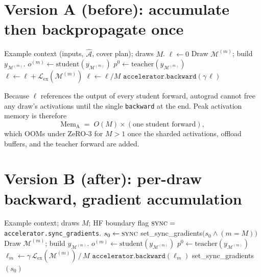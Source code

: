 \documentclass{article}
\newcommand{\Ahat}{\widehat{\mathcal A}}
\newcommand{\Mset}{\mathcal M}
\newcommand{\Lex}{\mathcal L_{\mathrm{ex}}}
\newcommand{\bad}[1]{\textcolor{red!70!black}{#1}}
\newcommand{\good}[1]{\textcolor{green!45!black}{#1}}
\theoremstyle{plain}
\theoremstyle{remark}
\begin{document}
\section{Version A (before): accumulate then backpropagate once}

\begin{algorithm}[h]
\caption{\bad{Buggy} multi-draw step --- one backward over $M$ live graphs}
\label{alg:before}
\small
\begin{algorithmic}[1]
\Require Example context (inputs, $\Ahat$, cover plan); draws $M$.
\State $\ell \gets 0$ \Comment{scalar accumulator holding \bad{all $M$ graphs}}
  \State Draw $\Mset^{(m)}$; build $y_{\Mset^{(m)}}$.
  \State \bad{$o^{(m)}\gets \text{student}(y_{\Mset^{(m)}})$} 
  \State $p^0\gets\text{teacher}(y_{\Mset^{(m)}})$ 
  \State $\ell \gets \ell + \Lex(\Mset^{(m)})$ \Comment{\bad{graphs $1..m$ still alive}}
\EndFor
\State $\ell \gets \ell / M$
\State $\texttt{accelerator.backward}(\gamma\,\ell)$ \Comment{\bad{one backward, $M$ graphs}}
\end{algorithmic}
\end{algorithm}

Because $\ell$ references the output of every student forward, autograd cannot
free any draw's activations until the single \texttt{backward} at the end. Peak
activation memory is therefore
\begin{equation}
  \text{Mem}_{\text{A}} \;=\; O(M)\times(\text{one student forward}),
\end{equation}
which OOMs under ZeRO-3 for $M>1$ once the sharded activations, offload buffers,
and the teacher forward are added.

\section{Version B (after): per-draw backward, gradient accumulation}

\begin{algorithm}[h]
\caption{\good{Fixed} multi-draw step --- one backward \emph{per draw}}
\label{alg:after}
\small
\begin{algorithmic}[1]
\Require Example context; draws $M$; HF boundary flag $\textsc{sync}=$\,\texttt{accelerator.sync\_gradients}.
\State $s_0 \gets \textsc{sync}$ 
  \State \good{set\_sync\_gradients}$\big(s_0 \wedge (m=M)\big)$ 
  \State Draw $\Mset^{(m)}$; build $y_{\Mset^{(m)}}$.
  \State $o^{(m)}\gets \text{student}(y_{\Mset^{(m)}})$
  \State $p^0\gets\text{teacher}(y_{\Mset^{(m)}})$ 
  \State $\ell_m \gets \gamma\,\Lex(\Mset^{(m)})\,/\,M$
  \State \good{$\texttt{accelerator.backward}(\ell_m)$} 
\EndFor
\State \good{set\_sync\_gradients}$(s_0)$ 
\end{algorithmic}
\end{algorithm}
\end{document}
